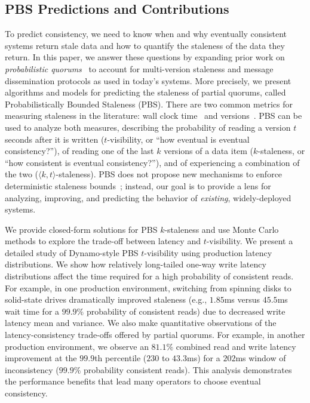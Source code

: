 \documentclass{vldb}
\begin{document}
\subsection{PBS Predictions and Contributions}

To predict consistency, we need to know when and why eventually
consistent systems return stale data and how to quantify the staleness
of the data they return.  In this paper, we answer these questions by
expanding prior work on \textit{probabilistic
  quorums}~\cite{prob-quorum, quorum-overview} to account for
multi-version staleness and message dissemination protocols as used in
today's systems. More precisely, we present algorithms and models for
predicting the staleness of partial quorums, called Probabilistically
Bounded Staleness (PBS). There are two common metrics for measuring
staleness in the literature: wall clock time~\cite{podc-hpl,
  vahdat-article, vahdat-bounded} and versions~\cite{podc-hpl, aqua,
  frac}.  PBS can be used to analyze both measures, describing the
probability of reading a version $t$ seconds after it is written
($t$-visibility, or ``how eventual is eventual consistency?''), of
reading one of the last $k$ versions of a data item ($k$-staleness, or
``how consistent is eventual consistency?''), and of experiencing a
combination of the two ($\langle k, t \rangle$-staleness). PBS does
not propose new mechanisms to enforce deterministic staleness
bounds~\cite{ aqua, trapp,vahdat-article, vahdat-bounded, frac};
instead, our goal is to provide a lens for analyzing, improving, and
predicting the behavior of \textit{existing}, widely-deployed systems.

We provide closed-form solutions for PBS $k$-staleness and use Monte
Carlo methods to explore the trade-off between latency and
$t$-visibility.  We present a detailed study of Dynamo-style PBS
$t$-visibility using production latency distributions. We show how
relatively long-tailed one-way write latency distributions affect the
time required for a high probability of consistent reads.  For
example, in one production environment, switching from spinning disks
to solid-state drives dramatically improved staleness (e.g., $1.85$ms
versus $45.5$ms wait time for a $99.9$\% probability of consistent
reads) due to decreased write latency mean and variance.  We also make
quantitative observations of the latency-consistency trade-offs
offered by partial quorums.  For example, in another production
environment, we observe an $81.1\%$ combined read and write latency
improvement at the $99.9$th percentile ($230$ to $43.3$ms) for a
$202$ms window of inconsistency ($99.9\%$ probability consistent
reads). This analysis demonstrates the performance benefits that lead
many operators to choose eventual consistency.
\end{document}

